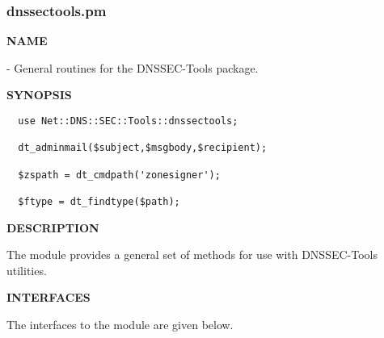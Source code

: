 \clearpage

\subsubsection{dnssectools.pm}

{\bf NAME}

 - General routines for the
DNSSEC-Tools package.

{\bf SYNOPSIS}

\begin{verbatim}
  use Net::DNS::SEC::Tools::dnssectools;

  dt_adminmail($subject,$msgbody,$recipient);

  $zspath = dt_cmdpath('zonesigner');

  $ftype = dt_findtype($path);
\end{verbatim}

{\bf DESCRIPTION}

The  module provides a general set of methods for use
with DNSSEC-Tools utilities.

{\bf INTERFACES}

The interfaces to the  module are given below.

